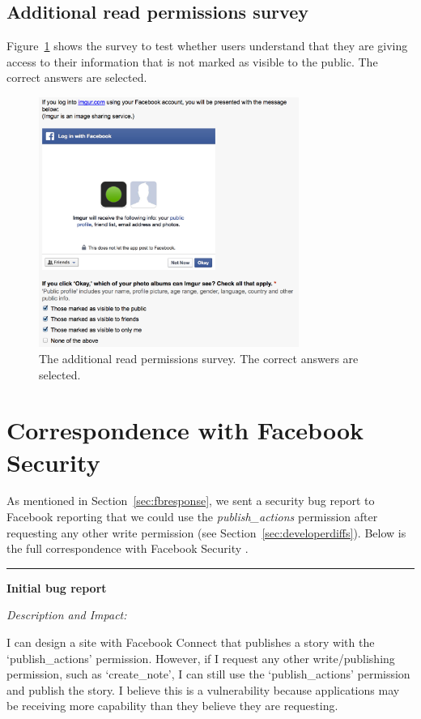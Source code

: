 \documentclass{sig-alternate}
\begin{document}
{\subsection{Additional read permissions survey}
\label{appendix:readsurvey2}
Figure~\ref{figure:71r} shows the survey to test whether users understand that they are giving access to their information that is not marked as visible to the public. The correct answers are selected.

\begin{figure}[h!]
  \centering
  \includegraphics[width=8.5cm]{71r}
  \caption{The additional read permissions survey. The correct answers are selected.}
  \label{figure:71r}
\end{figure}

\FloatBarrier
}{
\clearpage
\appendix
}
\section{Correspondence with Facebook Security}
\label{appendix:correspondence}

As mentioned in Section~\ref{sec:fbresponse}, we sent a security bug report to Facebook reporting that we could use the \emph{publish\_actions} permission after requesting any other write permission (see Section~\ref{sec:developerdiffs}). Below is the full correspondence with Facebook Security \cite{fbsecurity}.

\noindent\rule{6cm}{0.4pt}

\noindent\textbf{Initial bug report}

\noindent \emph{Description and Impact:}

\noindent I can design a site with Facebook Connect that publishes a story with the `publish\_actions' permission. However, if I request any other write/publishing permission, such as `create\_note', I can still use the `publish\_actions' permission and publish the story.  I believe this is a vulnerability because applications may be receiving more capability than they believe they are requesting.
\end{document}
